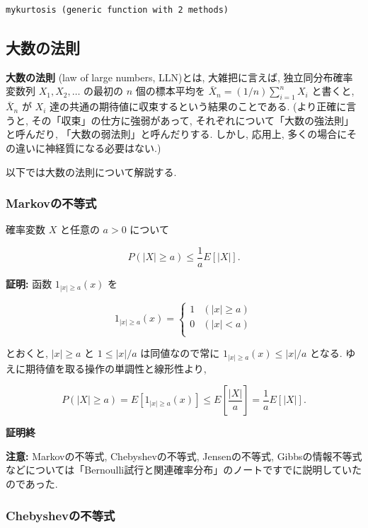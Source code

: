\documentclass[
  letterpaper,
  DIV=11,
  numbers=noendperiod]{scrartcl}
\begin{document}
\begin{verbatim}
mykurtosis (generic function with 2 methods)
\end{verbatim}

\hypertarget{ux5927ux6570ux306eux6cd5ux5247}{%
\subsection{大数の法則}\label{ux5927ux6570ux306eux6cd5ux5247}}

\textbf{大数の法則} (law of large numbers, LLN)とは, 大雑把に言えば,
独立同分布確率変数列 \(X_1,X_2,\ldots\) の最初の \(n\) 個の標本平均を
\(\bar{X}_n = (1/n)\sum_{i=1}^n X_i\) と書くと, \(\bar{X}_n\) が \(X_i\)
達の共通の期待値に収束するという結果のことである. (より正確に言うと,
その「収束」の仕方に強弱があって,
それぞれについて「大数の強法則」と呼んだり,
「大数の弱法則」と呼んだりする. しかし, 応用上,
多くの場合にその違いに神経質になる必要はない.)

以下では大数の法則について解説する.

\hypertarget{markovux306eux4e0dux7b49ux5f0f}{%
\subsubsection{Markovの不等式}\label{markovux306eux4e0dux7b49ux5f0f}}

確率変数 \(X\) と任意の \(a>0\) について

\[
P(|X|\ge a) \le \frac{1}{a}E[|X|].
\]

\textbf{証明:} 函数 \(1_{|x|\ge a}(x)\) を

\[
1_{|x|\ge a}(x) = \begin{cases}
1 & (|x|\ge a) \\
0 & (|x| <  a) \\
\end{cases}
\]

とおくと, \(|x|\ge a\) と \(1\le |x|/a\) は同値なので常に
\(1_{|x|\ge a}(x) \le |x|/a\) となる.
ゆえに期待値を取る操作の単調性と線形性より,

\[
P(|X|\ge a) = E[1_{|x|\ge a}(x)] \le E\left[\frac{|X|}{a}\right] = \frac{1}{a}E[|X|].
\]

\textbf{証明終}

\textbf{注意:} Markovの不等式, Chebyshevの不等式, Jensenの不等式,
Gibbsの情報不等式などについては「Bernoulli試行と関連確率分布」のノートですでに説明していたのであった.

\hypertarget{chebyshevux306eux4e0dux7b49ux5f0f}{%
\subsubsection{Chebyshevの不等式}\label{chebyshevux306eux4e0dux7b49ux5f0f}}
\end{document}
